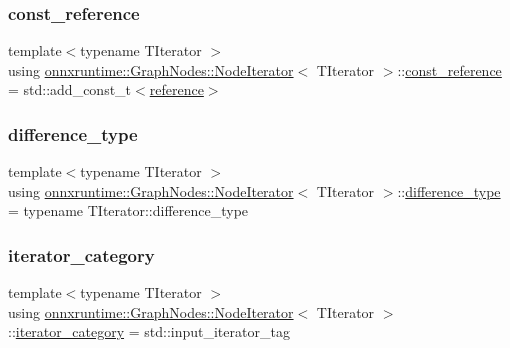 \subsubsection{\texorpdfstring{const\+\_\+reference}{const\_reference}}
{\footnotesize\ttfamily template$<$typename T\+Iterator $>$ \\
using \mbox{\hyperlink{classonnxruntime_1_1GraphNodes_1_1NodeIterator}{onnxruntime\+::\+Graph\+Nodes\+::\+Node\+Iterator}}$<$ T\+Iterator $>$\+::\mbox{\hyperlink{classonnxruntime_1_1GraphNodes_1_1NodeIterator_ac0484990a78d9725abe1adfa1b4eb476}{const\+\_\+reference}} =  std\+::add\+\_\+const\+\_\+t$<$\mbox{\hyperlink{classonnxruntime_1_1GraphNodes_1_1NodeIterator_ad66278df7151f4ed78d6191f3483e435}{reference}}$>$}

\mbox{\label{classonnxruntime_1_1GraphNodes_1_1NodeIterator_a583f317796564f91b8d1cd11a8b8a74f}} 
\subsubsection{\texorpdfstring{difference\+\_\+type}{difference\_type}}
{\footnotesize\ttfamily template$<$typename T\+Iterator $>$ \\
using \mbox{\hyperlink{classonnxruntime_1_1GraphNodes_1_1NodeIterator}{onnxruntime\+::\+Graph\+Nodes\+::\+Node\+Iterator}}$<$ T\+Iterator $>$\+::\mbox{\hyperlink{classonnxruntime_1_1GraphNodes_1_1NodeIterator_a583f317796564f91b8d1cd11a8b8a74f}{difference\+\_\+type}} =  typename T\+Iterator\+::difference\+\_\+type}

\mbox{\label{classonnxruntime_1_1GraphNodes_1_1NodeIterator_a3debcf3ca756298db3bc63b741516fb8}} 
\subsubsection{\texorpdfstring{iterator\+\_\+category}{iterator\_category}}
{\footnotesize\ttfamily template$<$typename T\+Iterator $>$ \\
using \mbox{\hyperlink{classonnxruntime_1_1GraphNodes_1_1NodeIterator}{onnxruntime\+::\+Graph\+Nodes\+::\+Node\+Iterator}}$<$ T\+Iterator $>$\+::\mbox{\hyperlink{classonnxruntime_1_1GraphNodes_1_1NodeIterator_a3debcf3ca756298db3bc63b741516fb8}{iterator\+\_\+category}} =  std\+::input\+\_\+iterator\+\_\+tag}

